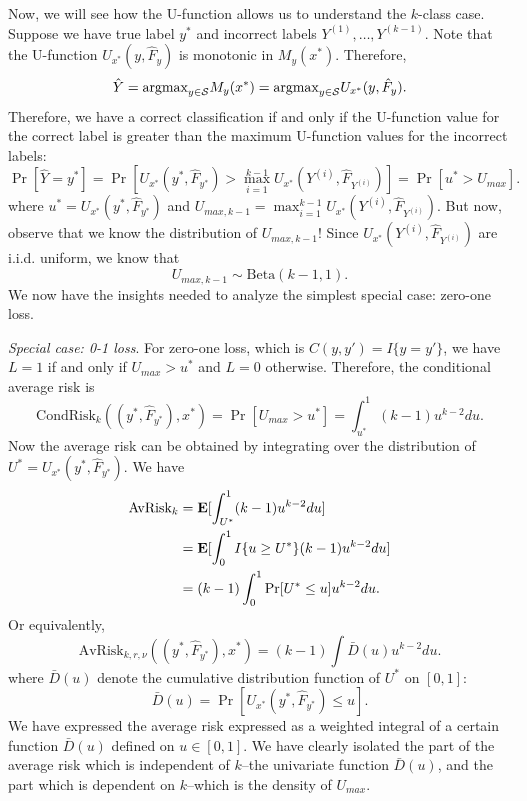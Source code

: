 \documentclass[12pt]{article}
\begin{document}
Now, we will see how the U-function allows us to understand the
$k$-class case.  Suppose we have true label $y^*$ and incorrect labels
$Y^{(1)},\hdots, Y^{(k-1)}$.  Note that the U-function
$U_{x^*}(y, \hat{F}_y)$ is monotonic in $M_y(x^*)$.  Therefore,
\[
\hat{Y} = \text{argmax}_{y \in \mathcal{S}} M_y(x^*) = \text{argmax}_{y \in \mathcal{S}} U_{x^*}(y, \hat{F}_y).
\]
Therefore, we have a correct classification if and only if the U-function value for the correct label
is greater than the maximum U-function values for the incorrect labels:
\[
\Pr[\hat{Y} = y^*] = \Pr[U_{x^*}(y^*, \hat{F}_{y^*}) > \max_{i=1}^{k-1} U_{x^*}(Y^{(i)}, \hat{F}_{Y^{(i)}})] =  \Pr[u^* > U_{max}].
\]
where $u^* = U_{x^*}(y^*, \hat{F}_{y^*})$ and $U_{max, k-1}
= \max_{i=1}^{k-1} U_{x^*}(Y^{(i)}, \hat{F}_{Y^{(i)}})$.  But now,
observe that we know the distribution of $U_{max, k-1}$!  Since
$U_{x^*}(Y^{(i)}, \hat{F}_{Y^{(i)}})$ are i.i.d. uniform, we know that
\begin{equation}\label{eq:umax_beta}
U_{max, k-1} \sim \text{Beta}(k-1, 1). 
\end{equation}
We now have the insights needed to analyze the simplest special case: zero-one loss.
\newline

\noindent \emph{Special case: 0-1 loss}.
For zero-one loss, which is $C(y, y') = I\{y = y'\}$, we have $L=1$ if
and only if $U_{max} > u^*$ and $L=0$ otherwise.  Therefore, the
conditional average risk is
\[
\text{CondRisk}_k((y^*, \hat{F}_{y^*}), x^*) = \Pr[U_{max} > u^*] = \int_{u^*}^1 (k-1) u^{k-2} du.
\]
Now the average risk can be obtained by integrating over the distribution of $U^* = U_{x^*}(y^*, \hat{F}_{y^*})$.
We have
\begin{align*}
\text{AvRisk}_k &= \textbf{E}[ \int_{U^*}^1 (k-1) u^{k-2} du] 
\\&= \textbf{E}[\int_0^1 I\{u \geq U^*\} (k-1) u^{k-2} du ]
\\&= (k-1) \int_0^1 \Pr[U^* \leq u] u^{k-2} du.
\end{align*}
Or equivalently,
\[
\text{AvRisk}_{k, r, \nu}((y^*, \hat{F}_{y^*}), x^*) = (k-1) \int \bar{D}(u) u^{k-2} du.
\]
where $\bar{D}(u)$ denote the cumulative distribution function of $U^*$ on $[0,1]$:
\[
\bar{D}(u) = \Pr[U_{x^*}(y^*, \hat{F}_{y^*}) \leq u].
\]
We have expressed the average risk expressed as a weighted integral of
a certain function $\bar{D}(u)$ defined on $u \in [0,1]$.  We have
clearly isolated the part of the average risk which is independent of
$k$--the univariate function $\bar{D}(u)$, and the part which is
dependent on $k$--which is the density of $U_{max}$.
\end{document}
